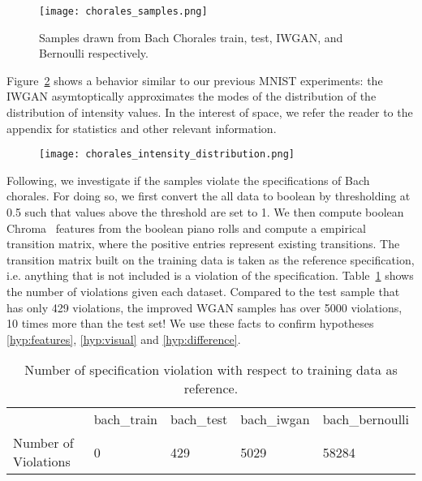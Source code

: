 \begin{figure}[!h]
  \begin{center}
  \texttt{[image: chorales\_samples.png]}
  \caption{Samples drawn from Bach Chorales train, test,
IWGAN, and Bernoulli respectively.}
  \label{fig:chorales_samples}
  \end{center}
\end{figure}

Figure~\ref{fig:chorales_intensity_distribution} shows a behavior similar to our
previous MNIST experiments: the IWGAN asymtoptically approximates the modes of
the distribution of the distribution of intensity values. In the interest of
space, we refer the reader to the appendix for statistics and other relevant
information. 

\begin{figure}[!h]
  \texttt{[image: chorales\_intensity\_distribution.png]}
  \caption{}
  \label{fig:chorales_intensity_distribution}
\end{figure}

Following, we investigate if the samples violate the specifications of
Bach chorales. For doing so, we first convert the all data to boolean by 
thresholding at 0.5 such that values above the threshold are set to 1. We then
compute boolean Chroma~\cite{peeters2004large} features from the boolean piano
rolls and compute a empirical transition matrix, where the positive
entries represent existing transitions. The transition matrix built on the training
data is taken as the reference specification, i.e. anything that is not included
is a violation of the specification. Table~\ref{tbl:chroma_violations}
shows the number of violations given each dataset. Compared to the test sample
that has only 429 violations, the improved WGAN samples has over 5000
violations, 10 times more than the test set! We use these facts to confirm
hypotheses \ref{hyp:features}, \ref{hyp:visual} and \ref{hyp:difference}.

\begin{table}[!h]
\centering
\begin{tabular}{lllll}
& \cellcolor[HTML]{C0C0C0}bach\_train & \cellcolor[HTML]{C0C0C0}bach\_test & \cellcolor[HTML]{C0C0C0}bach\_iwgan & \cellcolor[HTML]{C0C0C0}bach\_bernoulli \\ \cline{2-5} 
\multicolumn{1}{l|}{\cellcolor[HTML]{C0C0C0}Number of Violations} & 0                                   & 429                                & 5029                                & 58284                                  
\end{tabular}
\caption{Number of specification violation with respect to training data as
    reference.}
\label{tbl:chroma_violations}
\end{table}

